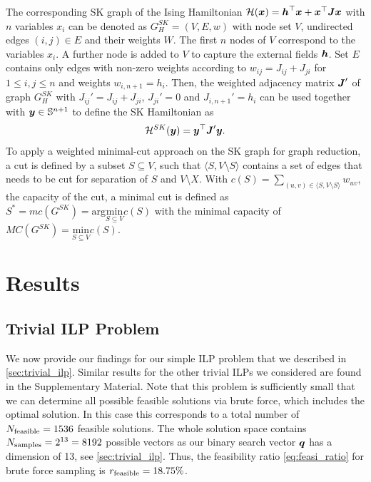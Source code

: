 \documentclass[utf8, nocrop]{FrontiersinHarvardArxiv}
\def\ve#1{\mathlette{\boldmath}{#1}}
\def\mathlette#1#2{{\mathchoice{\mbox{#1$\displaystyle #2$}}%
        {\mbox{#1$\textstyle #2$}}%
        {\mbox{#1$\scriptstyle #2$}}%
        {\mbox{#1$\scriptscriptstyle #2$}}}}
\def\argmin#1{\mathrm{arg}\underset{#1}{\mathrm{min}}}
\def\min#1{\underset{#1}{\mathrm{min}}}
\begin{document}
The corresponding SK graph of the Ising Hamiltonian $\mathcal{H}(\ve{x})=\ve{h}^\top \ve{x}+\ve{x}^\top\ve{J}\ve{x}$ with $n$ variables $x_i$ can be denoted as $G_H^{SK}=(V,E,w)$ with node set $V$, undirected edges $(i,j)\in E$ and their weights $W$.
The first $n$ nodes of $V$ correspond to the variables $x_i$. A further node is added to $V$ to capture the external fields $\ve{h}$. Set $E$ contains only edges with non-zero weights according to $w_{ij}=J_{ij}+J_{ji}$ for $1\leq i,j\leq n$ and weights $w_{i,n+1}=h_i$. Then, the weighted adjacency matrix $\ve{J}'$ of graph $G_H^{SK}$ with $J_{ij}'=J_{ij}+J_{ji}$, $J_{ji}'=0$ and $J_{i,n+1}'=h_i$ can be used together with $\ve{y}\in\mathbb{S}^{n+1}$ to define the SK Hamiltonian as 
\begin{equation}
    \mathcal{H}^{SK}(\ve{y})=\ve{y}^\top\ve{J}'\ve{y}.
\end{equation}
To apply a weighted minimal-cut approach on the SK graph for graph reduction, a cut is defined by a subset $S \subseteq V$, such that $\langle S,V$\textbackslash$ S\rangle$ contains a set of edges that needs to be cut for separation of $S$ and $V$\textbackslash $X$. With $c(S)=\sum_{(u,v)\in\langle S,V\text{\textbackslash} S\rangle}w_{uv}$, the capacity of the cut, a minimal cut is defined as $S^\ast=mc(G^{SK})=\argmin{S\subseteq V} c(S)$ with the minimal capacity of $MC(G^{SK})=\min{S\subseteq V} c(S)$.

\section{Results}
\label{sec:results}

\subsection{Trivial ILP Problem}
We now provide our findings for our simple ILP problem that we described in \autoref{sec:trivial_ilp}.  Similar results for the other trivial ILPs we considered are found in the Supplementary Material.  Note that this problem is sufficiently small that we can determine all possible feasible solutions via brute force, which includes the optimal solution.  In this case this corresponds to a total number of $N_\mathrm{feasible}=1536$ feasible solutions. The whole solution space contains $N_\mathrm{samples}=2^{13}=8192$ possible vectors as our binary search vector $\ve q$ has a dimension of 13, see \autoref{sec:trivial_ilp}. Thus, the feasibility ratio \eqref{eq:feasi_ratio} for brute force sampling is $r_\mathrm{feasible}=18.75\%$.
\end{document}
